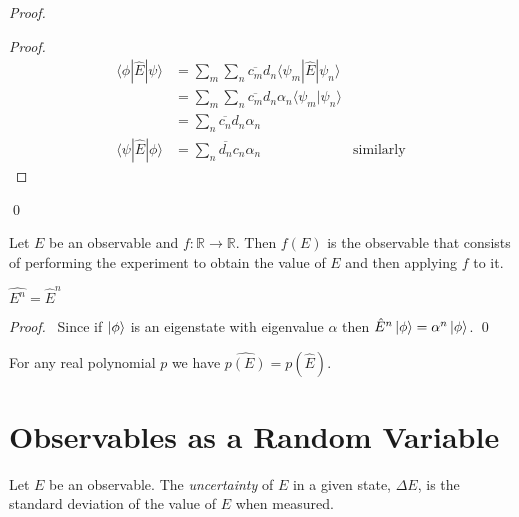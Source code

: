 \begin{proof}
\pf
{}
\begin{proof}
	\pf
	\begin{align*}
		\langle \phi | \hat{E} | \psi \rangle
		& = \sum_m \sum_n \overline{c_m} d_n \langle \psi_m | \hat{E} | \psi_n \rangle \\
		& = \sum_m \sum_n \overline{c_m} d_n \alpha_n \langle \psi_m | \psi_n \rangle \\
		& = \sum_n \overline{c_n} d_n \alpha_n \\
		\langle \psi | \hat{E} | \phi \rangle & = \sum_n \overline{d_n} c_n \alpha_n & \text{similarly}
	\end{align*}
\end{proof}
\qed
\end{proof}

\begin{df}
Let $E$ be an observable and $f : \mathbb{R} \rightarrow \mathbb{R}$. Then $f(E)$ is the observable that consists of performing the experiment to obtain the value of $E$ and then applying $f$ to it.
\end{df}

\begin{prop}
$\widehat{E^n} = \hat{E}^n$
\end{prop}

\begin{proof}
\pf\ Since if $\left| {\phi} \right\rangle$ is an eigenstate with eigenvalue $\alpha$ then $\hat{E}^n \left| {\phi} \right\rangle = \alpha^n \left| {\phi} \right\rangle$. \qed
\end{proof}

\begin{cor}
For any real polynomial $p$ we have $\widehat{p(E)} = p(\hat{E})$.
\end{cor}

\section{Observables as a Random Variable}

\begin{df}[Uncertainty]
Let $E$ be an observable. The \emph{uncertainty} of $E$ in a given state, $\Delta E$, is the standard deviation of the value of $E$ when measured.
\end{df}

